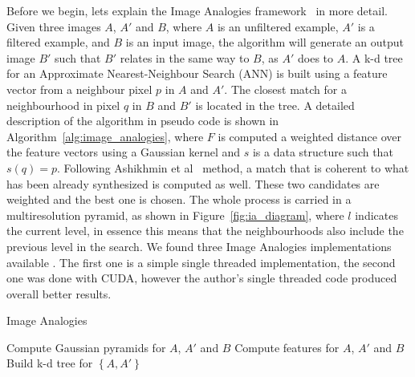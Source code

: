 \documentclass[11pt]{report}
\begin{document}
Before we begin, lets explain the Image Analogies framework~\cite{Hertzmann2001} in more detail.
Given three images $A$, $A'$ and $B$, where $A$ is an unfiltered example, $A'$ is a filtered example, and $B$ is an input image, the algorithm will generate an output image $B'$ such that $B'$ relates in the same way to $B$, as $A'$ does to $A$.
A k-d tree for an Approximate Nearest-Neighbour Search (ANN) is built using a feature vector from a neighbour pixel $p$ in $A$ and $A'$.
The closest match for a neighbourhood in pixel $q$ in $B$ and $B'$ is located in the tree.
A detailed description of the algorithm in pseudo code is shown in Algorithm~\ref{alg:image_analogies}, where $F$ is computed a weighted distance over the feature vectors using a Gaussian kernel and $s$ is a data structure such that $s(q) = p$.
Following Ashikhmin et al~\cite{Ashikhmin2001} method, a match that is coherent to what has been already synthesized is computed as well.
These two candidates are weighted and the best one is chosen.
The whole process is carried in a multiresolution pyramid, as shown in Figure~\ref{fig:ia_diagram}, where $l$ indicates the current level, in essence this means that the neighbourhoods also include the previous level in the search.
We found three Image Analogies implementations available \cite{ImAnSingleThreadWeb, ImAnCudaWeb, ImAnHertzmannWeb}.
The first one is a simple single threaded implementation, the second one was done with CUDA, however the author's single threaded code produced overall better results.

\begin{algorithm}[htbp!] 
	\caption{Image Analogies}
	\label{alg:image_analogies}
	
	Compute Gaussian pyramids for $A$, $A'$ and $B$\;
	Compute features for $A$, $A'$ and $B$\;
	Build k-d tree for $\left\lbrace A, A' \right\rbrace$\;

\end{algorithm}
\end{document}
